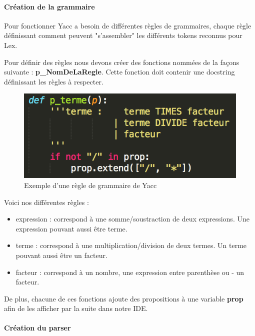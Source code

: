 \documentclass[a4paper,12pt]{article}
\begin{document}
			\paragraph{Création de la grammaire}

				Pour fonctionner Yacc a besoin de différentes règles de grammaires, chaque règle définissant comment peuvent "s'assembler" les différents tokens reconnus pour Lex.

				Pour définir des règles nous devons créer des fonctions nommées de la façons suivante : \textbf{p\_NomDeLaRegle}. Cette fonction doit contenir une docstring définissant les règles à respecter.

				\begin{figure}[h!]
					\begin{center}
						\includegraphics[scale=1]{images/exp_grammaire_yacc}
						\caption{Exemple d'une règle de grammaire de Yacc}
					\end{center}
				\end{figure}

				Voici nos différentes règles : 
				\begin{itemize}
					\item expression : correspond à une somme/soustraction de deux expressions. Une expression pouvant aussi être terme.
					\item terme : correspond à une multiplication/division de deux termes. Un terme pouvant aussi être un facteur.
					\item facteur : correspond à un nombre, une expression entre parenthèse ou - un facteur.
				\end{itemize}

				De plus, chacune de ces fonctions ajoute des propositions à une variable \textbf{prop} afin de les afficher par la suite dans notre IDE.

			\paragraph{Création du parser}
\end{document}
